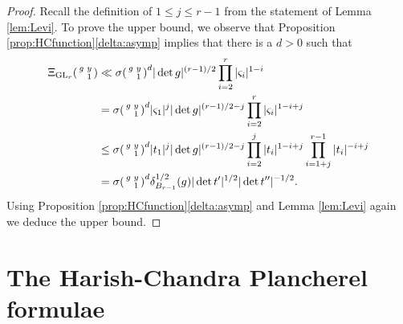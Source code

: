 \documentclass[12pt]{amsart}
\theoremstyle{remark}
\numberwithin{equation}{section}
\newcommand{\GL}{\mathrm{GL}}
\theoremstyle{definition}
\newenvironment{psmatrix}
  {\left(\begin{smallmatrix}}
  {\end{smallmatrix}\right)}
\numberwithin{equation}{subsection}
\begin{document}
\begin{proof}
Recall the definition of $1 \leq j \leq r-1$ from the statement of Lemma \ref{lem:Levi}. To prove the upper bound, we observe that Proposition \ref{prop:HCfunction}\ref{delta:asymp} implies that
there is a $d>0$ such that
\begin{align*}
    \Xi_{\GL_r}\begin{psmatrix}
    g & y\\
    & 1
\end{psmatrix}&\ll \sigma\begin{psmatrix} g & y\\ & 1 \end{psmatrix}^d|\det g|^{(r-1)/2}\prod_{i=2}^{r}|\varsigma_i|^{1-i}\\&=
\sigma\begin{psmatrix}
    g & y\\
    & 1
\end{psmatrix}^{d}|\varsigma_1|^{j}|\det g|^{(r-1)/2-j} \prod_{i=2}^{r} |\varsigma_i|^{1-i+j}\\
&\le \sigma\begin{psmatrix}
    g & y\\
    & 1
\end{psmatrix}^{d}|t_1|^{j}|\det g|^{(r-1)/2-j} \prod_{i=2}^{j} |t_i|^{1-i+j}\prod_{i=1+j}^{r-1} |t_i|^{-i+j}\\
&= \sigma\begin{psmatrix}
    g & y\\
    & 1
\end{psmatrix}^{d}\delta_{B_{r-1}}^{1/2}(g) |\det t'|^{1/2}|\det t''|^{-1/2}.
\end{align*}
Using Proposition \ref{prop:HCfunction}\ref{delta:asymp} and Lemma \ref{lem:Levi} again we deduce the upper bound. 
\end{proof}
    










\section{The Harish-Chandra Plancherel formulae} \label{sec:HC}
\end{document}
